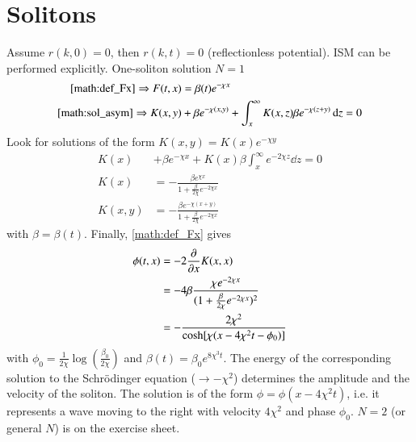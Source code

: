 \section{Solitons}
Assume $r(k, 0) = 0$, then $r(k, t)=0$ (reflectionless potential). ISM can be performed explicitly. One-soliton solution $N=1$ 
\begin{align*}
	\eqref{math:def_Fx} \Rightarrow F(t, x) &= \beta (t) e^{-\chi x} \\
	\eqref{math:sol_asym} \Rightarrow K(x, y) &+ \beta e^{-\chi(x, y)} + \int_{x}^{\infty} K(x, z) \beta e^{-\chi (z+y)} \dd{z} = 0
\end{align*}
Look for solutions of the form $K(x, y) = K(x) e^{-\chi y}$
\begin{align*}
	K(x) &+ \beta e^{-\chi x} + K(x) \beta \int_x^{\infty} e^{-2\chi z} \dd{z} = 0 \\
	K(x) &= - \frac{\beta e^{\chi x}}{1 + \frac{\beta}{2 \chi} e^{-2\chi x}} \\
	K(x, y) &= - \frac{\beta e^{-\chi(x+y)}}{1+\frac{\beta}{2\chi}e^{-2\chi x}}
\end{align*}
with $\beta = \beta(t)$. Finally, \eqref{math:def_Fx} gives
\begin{align*}
	\phi(t, x) &= -2 \pdv{x} K(x, x)  \\
				  &= -4 \beta \frac{\chi e^{-2\chi x}}{(1+\frac{\beta}{2\chi} e^{-2\chi x})^2} \\
				  &= - \frac{2 \chi^2}{\cosh[\chi(x - 4 \chi^2t - \phi_0)]}
\end{align*}
with $\phi_0 = \frac{1}{2\chi} \log(\frac{\beta_0}{2\chi})$ and $\beta(t) = \beta_0 e^{8 \chi^3 t}$. The energy of the corresponding solution to the Schrödinger equation ($\rightarrow - \chi^2$) determines the amplitude and the velocity of the soliton. The solution is of the form $\phi = \phi(x-4\chi^2 t)$, i.e. it represents a wave moving to the right with velocity $4\chi^2$ and phase $\phi_0$.
$N=2$ (or general $N$) is on the exercise sheet.
